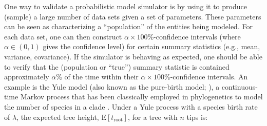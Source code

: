 \documentclass[oneside]{article}
\begin{document}
One way to validate a probabilistic model simulator is by using it to produce (sample) a large number of data sets given a set of parameters.
These parameters can be seen as characterizing a ``population'' of the entities being modeled.
For each data set, one can then construct $\alpha \times 100 \%$-confidence intervals (where $\alpha \in (0,1)$ gives the confidence level) for certain summary statistics (e.g., mean, variance, covariance).
If the simulator is behaving as expected, one should be able to verify that the (population or ``true'') summary statistic is contained approximately $\alpha$\% of the time within their $\alpha \times 100\%$-confidence intervals.
An example is the Yule model (also known as the pure-birth model; \citealt{yule24}), a continuous-time Markov process that has been classically employed in phylogenetics to model the number of species in a clade \citep{yule24,aldous01}.
Under a Yule process with a species birth rate of $\lambda$, the expected tree height, $\text{E}[t_{\text{root}}]$, for a tree with $n$ tips is:
\vspace{.5cm}
\end{document}
